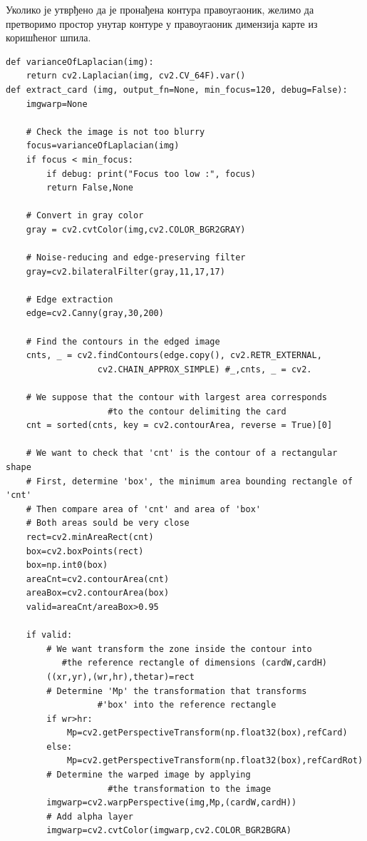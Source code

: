\documentclass[12pt, а4paper]{article}
\begin{document}
Уколико је утврђено да је пронађена контура правоугаоник, желимо да претворимо простор унутар
контуре у правоугаоник димензија карте из коришћеног шпила.



\begin{verbatim}
def varianceOfLaplacian(img):
    return cv2.Laplacian(img, cv2.CV_64F).var()
def extract_card (img, output_fn=None, min_focus=120, debug=False):
    imgwarp=None
    
    # Check the image is not too blurry
    focus=varianceOfLaplacian(img)
    if focus < min_focus: 
        if debug: print("Focus too low :", focus)
        return False,None
    
    # Convert in gray color
    gray = cv2.cvtColor(img,cv2.COLOR_BGR2GRAY)
    
    # Noise-reducing and edge-preserving filter
    gray=cv2.bilateralFilter(gray,11,17,17)
    
    # Edge extraction
    edge=cv2.Canny(gray,30,200)
    
    # Find the contours in the edged image
    cnts, _ = cv2.findContours(edge.copy(), cv2.RETR_EXTERNAL, 
			      cv2.CHAIN_APPROX_SIMPLE) #_,cnts, _ = cv2.
    
    # We suppose that the contour with largest area corresponds 
				    #to the contour delimiting the card
    cnt = sorted(cnts, key = cv2.contourArea, reverse = True)[0]
    
    # We want to check that 'cnt' is the contour of a rectangular shape
    # First, determine 'box', the minimum area bounding rectangle of 'cnt'
    # Then compare area of 'cnt' and area of 'box'
    # Both areas sould be very close
    rect=cv2.minAreaRect(cnt)
    box=cv2.boxPoints(rect)
    box=np.int0(box)
    areaCnt=cv2.contourArea(cnt)
    areaBox=cv2.contourArea(box)
    valid=areaCnt/areaBox>0.95
    
    if valid:
        # We want transform the zone inside the contour into 
		   #the reference rectangle of dimensions (cardW,cardH)
        ((xr,yr),(wr,hr),thetar)=rect
        # Determine 'Mp' the transformation that transforms 
				  #'box' into the reference rectangle
        if wr>hr:
            Mp=cv2.getPerspectiveTransform(np.float32(box),refCard)
        else:
            Mp=cv2.getPerspectiveTransform(np.float32(box),refCardRot)
        # Determine the warped image by applying
				    #the transformation to the image
        imgwarp=cv2.warpPerspective(img,Mp,(cardW,cardH))
        # Add alpha layer
        imgwarp=cv2.cvtColor(imgwarp,cv2.COLOR_BGR2BGRA)
        

\end{verbatim}
\end{document}
